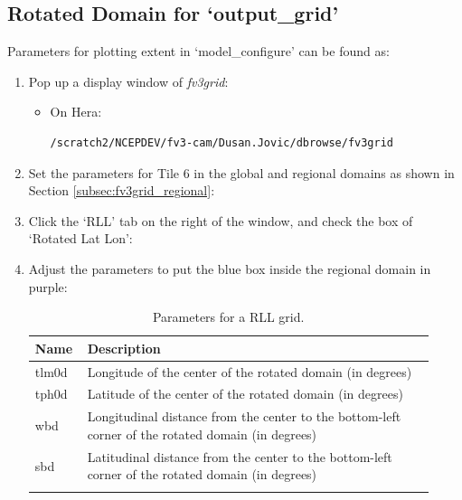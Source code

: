 \documentclass[11pt,fleqn]{report}              %
\begin{document}
\subsection{Rotated Domain for `output\_grid'}
\label{subsec:fv3grid_rll}

Parameters for plotting extent in `model\_configure' can be found as:

\begin{enumerate}
\item Pop up a display window of {\it fv3grid}:

\begin{itemize}
\item On Hera:
\lstset{language=bash}   
\begin{lstlisting}[frame=trBL]
/scratch2/NCEPDEV/fv3-cam/Dusan.Jovic/dbrowse/fv3grid
\end{lstlisting}
\end{itemize}

\item Set the parameters for Tile 6 in the global and regional domains as shown in Section \ref{subsec:fv3grid_regional}:

\item Click the `RLL' tab on the right of the window, and check the box of `Rotated Lat Lon':

\item Adjust the parameters to put the blue box inside the regional domain in purple:
{
\fontsize{10}{12}\selectfont
\begin{longtable}{p{0.1\linewidth} | p{0.82\linewidth} }
\hline
\hline
Name & Description \\
\hline
 tlm0d & Longitude of the center of the rotated domain (in degrees) \\
 tph0d & Latitude of the center of the rotated domain (in degrees) \\
 wbd & Longitudinal distance from the center to the bottom-left corner of the rotated domain (in degrees)\\
 sbd & Latitudinal distance from the center to the bottom-left corner of the rotated domain (in degrees) \\
\hline
\caption{Parameters for a RLL grid.}
\label{table:fv3grid_RLL}
\end{longtable}
}


\end{enumerate}
\end{document}
